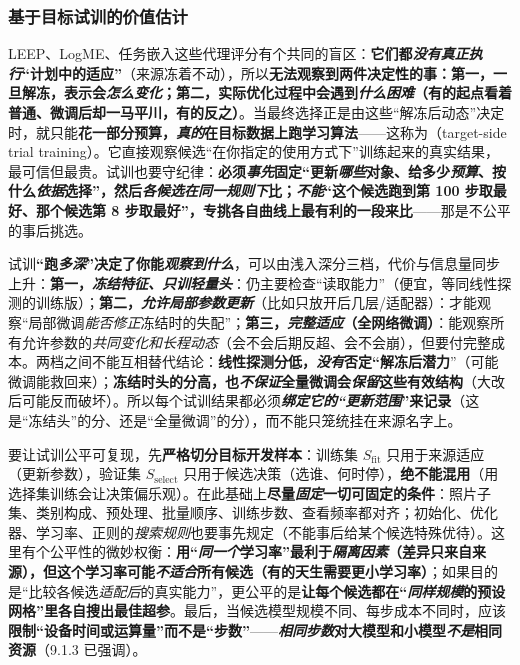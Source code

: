 \subsubsection{基于目标试训的价值估计}
\label{sec:ket-reuse-target-trials}

LEEP、LogME、任务嵌入这些代理评分有个共同的盲区：\textbf{它们都\emph{没有真正执行}“计划中的适应”}（来源冻着不动），所以\textbf{无法观察到两件决定性的事：第一，一旦解冻，表示会\emph{怎么变化}；第二，实际优化过程中会遇到\emph{什么困难}（有的起点看着普通、微调后却一马平川，有的反之）}。当最终选择正是由这些“解冻后动态”决定时，就只能\textbf{花一部分预算，\emph{真的}在目标数据上跑学习算法}——这称为（target-side trial training）。它直接观察候选“在你指定的使用方式下”训练起来的真实结果，最可信但最贵。试训也要守纪律：\textbf{必须\emph{事先}固定“更新\emph{哪些}对象、给多少\emph{预算}、按什么\emph{依据}选择”，然后\emph{各候选在同一规则下}比；\emph{不能}“这个候选跑到第 100 步取最好、那个候选第 8 步取最好”，专挑各自曲线上最有利的一段来比}——那是不公平的事后挑选。

试训\textbf{“跑\emph{多深}”决定了你能\emph{观察到什么}}，可以由浅入深分三档，代价与信息量同步上升：\textbf{第一，\emph{冻结特征、只训轻量头}}：仍主要检查“读取能力”（便宜，等同线性探测的训练版）；\textbf{第二，\emph{允许局部参数更新}}（比如只放开后几层/适配器）：才能观察“局部微调\emph{能否修正}冻结时的失配”；\textbf{第三，\emph{完整适应}（全网络微调）}：能观察所有允许参数的\emph{共同变化和长程动态}（会不会后期反超、会不会崩），但要付完整成本。两档之间不能互相替代结论：\textbf{线性探测分低，\emph{没有}否定“解冻后潜力}”（可能微调能救回来）；\textbf{冻结时头的分高，也\emph{不保证}全量微调会\emph{保留}这些有效结构}（大改后可能反而破坏）。所以每个试训结果都必须\textbf{\emph{绑定它的“更新范围}”来记录}（这是“冻结头”的分、还是“全量微调”的分），而不能只笼统挂在来源名字上。

要让试训公平可复现，先\textbf{严格切分目标开发样本}：训练集 $S_{\mathrm{fit}}$ 只用于来源适应（更新参数），验证集 $S_{\mathrm{select}}$ 只用于候选决策（选谁、何时停），\textbf{绝不能混用}（用选择集训练会让决策偏乐观）。在此基础上\textbf{尽量\emph{固定}一切可固定的条件}：照片子集、类别构成、预处理、批量顺序、训练步数、查看频率都对齐；初始化、优化器、学习率、正则的\emph{搜索规则}也要事先规定（不能事后给某个候选特殊优待）。这里有个公平性的微妙权衡：\textbf{用“\emph{同一个}学习率”最利于\emph{隔离因素}（差异只来自来源），但这个学习率可能\emph{不适合}所有候选（有的天生需要更小学习率）}；如果目的是“比较各候选\emph{适配后}的真实能力”，更公平的是\textbf{让每个候选都在“\emph{同样规模}的预设网格”里各自搜出最佳超参}。最后，当候选模型规模不同、每步成本不同时，应该\textbf{限制“设备时间或运算量”而不是“步数”}——\textbf{\emph{相同步数}对大模型和小模型\emph{不是}相同资源}（9.1.3 已强调）。

